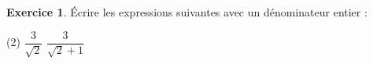 \documentclass{exam}
\theoremstyle{definition}
\newtheorem{exercice}{Exercice}
\begin{document}
\begin{exercice}
Écrire les expressions suivantes avec un dénominateur entier :
\begin{tasks}(2)
    \task $\dfrac{3}{\sqrt{2}}$
    \task $\dfrac{3}{\sqrt{2} + 1}$
\end{tasks}
\begin{center}
    \framebox[1\textwidth]{\parbox{5.5in}{%
    \vspace{10em}}}
\end{center}
\end{exercice}
\end{document}
